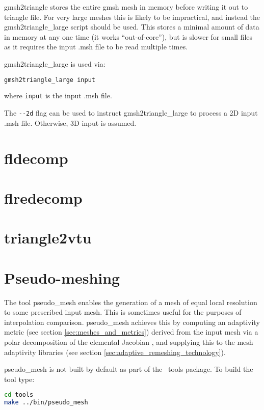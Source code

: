 gmsh2triangle stores the entire gmsh mesh in memory before writing it out to
triangle file. For very large meshes this is likely to be impractical,
and instead the gmsh2triangle\_large script should be used. This stores a minimal
amount of data in memory at any one time (it works ``out-of-core''), but
is slower for small files as it requires the input .msh file to be read multiple
times.

gmsh2triangle\_large is used via:

\begin{lstlisting}[language = Bash]
gmsh2triangle_large input
\end{lstlisting}

where \lstinline[language = Bash]*input* is the input .msh file.

The \lstinline[language = Bash]+--2d+ flag can be used to instruct gmsh2triangle\_large
to process a 2D input .msh file. Otherwise, 3D input is assumed.

\section{fldecomp}

\section{flredecomp}

\section{triangle2vtu}

\section{Pseudo-meshing}

The tool pseudo\_mesh enables the generation of a mesh of equal local resolution
to some prescribed input mesh. This is sometimes useful for the purposes of
interpolation comparison. pseudo\_mesh achieves this by computing an adaptivity
metric (see section \ref{sec:meshes_and_metrics}) derived from the input mesh
via a polar decomposition of the
elemental Jacobian \citep{micheletti2006}, and supplying this to the mesh adaptivity libraries
(see section \ref{sec:adaptive_remeshing_technology}).

pseudo\_mesh is not built by default as part of the \fluidity\ tools package. To
build the tool type:

\begin{lstlisting}[language = Bash]
cd tools
make ../bin/pseudo_mesh
\end{lstlisting}

